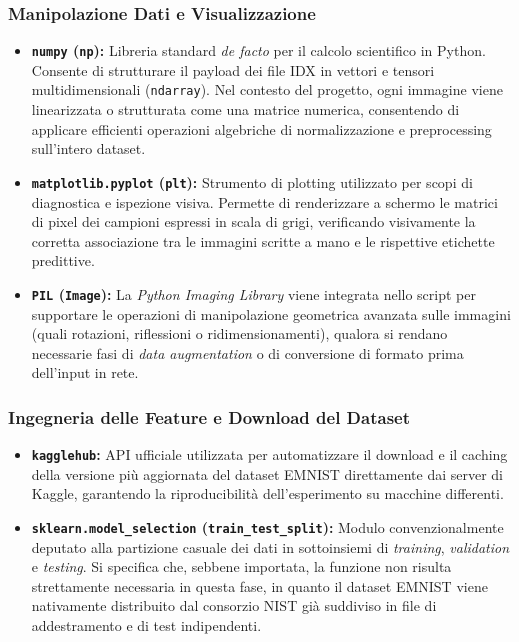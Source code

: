 \documentclass[12pt,a4paper]{article}
\begin{document}
	\subsubsection{Manipolazione Dati e Visualizzazione}
	\begin{itemize}
		\item \textbf{\texttt{numpy} (\texttt{np}):} Libreria standard \textit{de facto} per il calcolo scientifico in Python. Consente di strutturare il payload dei file IDX in vettori e tensori multidimensionali (\texttt{ndarray}). Nel contesto del progetto, ogni immagine viene linearizzata o strutturata come una matrice numerica, consentendo di applicare efficienti operazioni algebriche di normalizzazione e preprocessing sull'intero dataset.
		\item \textbf{\texttt{matplotlib.pyplot} (\texttt{plt}):} Strumento di plotting utilizzato per scopi di diagnostica e ispezione visiva. Permette di renderizzare a schermo le matrici di pixel dei campioni espressi in scala di grigi, verificando visivamente la corretta associazione tra le immagini scritte a mano e le rispettive etichette predittive.
		\item \textbf{\texttt{PIL} (\texttt{Image}):} La \textit{Python Imaging Library} viene integrata nello script per supportare le operazioni di manipolazione geometrica avanzata sulle immagini (quali rotazioni, riflessioni o ridimensionamenti), qualora si rendano necessarie fasi di \textit{data augmentation} o di conversione di formato prima dell'input in rete.
	\end{itemize}

	\subsubsection{Ingegneria delle Feature e Download del Dataset}
	\begin{itemize}
		\item \textbf{\texttt{kagglehub}:} API ufficiale utilizzata per automatizzare il download e il caching della versione più aggiornata del dataset EMNIST direttamente dai server di Kaggle, garantendo la riproducibilità dell'esperimento su macchine differenti.
		\item \textbf{\texttt{sklearn.model\_selection} (\texttt{train\_test\_split}):} Modulo convenzionalmente deputato alla partizione casuale dei dati in sottoinsiemi di \textit{training}, \textit{validation} e \textit{testing}. Si specifica che, sebbene importata, la funzione non risulta strettamente necessaria in questa fase, in quanto il dataset EMNIST viene nativamente distribuito dal consorzio NIST già suddiviso in file di addestramento e di test indipendenti.
	\end{itemize}
\end{document}
